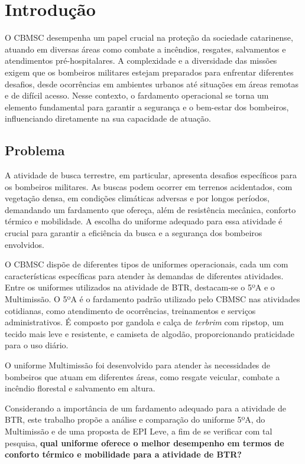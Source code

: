 \chapter{Introdução}



	O \acrfull{CBMSC} desempenha um papel crucial na proteção da sociedade catarinense, atuando em 
	diversas áreas como combate a incêndios, resgates, salvamentos e atendimentos pré-hospitalares. 
	A complexidade e a diversidade das missões exigem que os bombeiros militares estejam preparados 
	para enfrentar diferentes desafios, desde ocorrências em ambientes urbanos até situações em 
	áreas remotas e de difícil acesso.  Nesse contexto, o fardamento operacional se torna um 
	elemento fundamental para garantir a segurança e o bem-estar dos bombeiros, influenciando 
	diretamente na sua capacidade de atuação.

	\section{Problema}

		A atividade de busca terrestre, em particular, apresenta desafios específicos para os bombeiros militares.
		As buscas podem ocorrer em terrenos acidentados, com vegetação densa, em condições climáticas adversas e por longos períodos,
		demandando um fardamento que ofereça, além de resistência mecânica, conforto térmico e mobilidade.  
		A escolha do uniforme adequado para essa atividade é crucial para garantir a eficiência da busca e a segurança dos bombeiros envolvidos.

		O \acrshort{CBMSC} dispõe de diferentes tipos de uniformes operacionais, cada um com características específicas para atender
		às demandas de diferentes atividades.  Entre os uniformes utilizados na atividade de \acrfull{BTR}, destacam-se o 5ºA e o Multimissão.
		O 5ºA é o fardamento padrão utilizado pelo \acrshort{CBMSC} nas atividades cotidianas, como atendimento de ocorrências,
		treinamentos e serviços administrativos. É composto por gandola e calça de \textit{terbrim} com ripstop, um tecido mais leve e 
		resistente, e camiseta de algodão, proporcionando praticidade para o uso diário.

		O uniforme Multimissão foi desenvolvido para atender às necessidades de bombeiros que atuam em diferentes áreas, como resgate veicular,
	 	combate a incêndio florestal e salvamento em altura.

		Considerando a importância de um fardamento adequado para a atividade de \acrshort{BTR}, este trabalho propõe a análise e comparação do
	 	uniforme 5ºA, do Multimissão e de uma proposta de EPI Leve, a fim de se verificar com tal pesquisa, \textbf{qual uniforme oferece o melhor desempenho 
	 	em termos de conforto térmico e mobilidade para a atividade de \acrlong{BTR}?}

